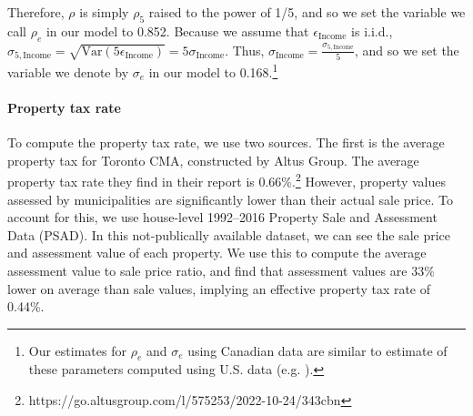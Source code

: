 \documentclass[parskip=full]{article}
\begin{document}
\noindent Therefore, $\rho$ is simply $\rho_{5}$ raised to the power of 1/5, and so we set the variable we call $\rho_{e}$ in our model to 0.852. Because we assume that $\epsilon_{\mbox{Income}}$ is i.i.d.,  $\sigma_{5,\mbox{Income}}=\sqrt{\mbox{Var}\left(5\epsilon_{\mbox{Income}}\right)}=5\sigma_{\mbox{Income}}$. Thus, $\sigma_{\mbox{Income}}=\frac{\sigma_{5,\mbox{Income}}}{5}$, and so we set the variable we denote by $\sigma_{e}$ in our model to 0.168.\footnote{Our estimates for $\rho_{e}$ and $\sigma_{e}$ using Canadian data are similar to estimate of these parameters computed using U.S. data (e.g. \citet{rs-2021}).}

\paragraph{Property tax rate}

To compute the property tax rate, we use two sources. The first is the average property tax for Toronto CMA, constructed by Altus Group. The average property tax rate they find in their report is 0.66\%.\footnote{https://go.altusgroup.com/l/575253/2022-10-24/343cbn} However, property values assessed by municipalities are significantly lower than their actual sale price. To account for this, we use house-level 1992--2016 Property Sale and Assessment Data (PSAD). In this not-publically available dataset, we can see the sale price and assessment value of each property. We use this to compute the average assessment value to sale price ratio, and find that assessment values are 33\% lower on average than sale values, implying an effective property tax rate of 0.44\%.

\end{document}
